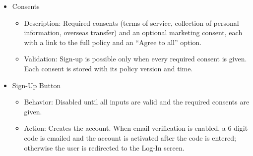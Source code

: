 \documentclass[conference]{IEEEtran}
\begin{document}
\begin{itemize}
\begin{itemize}
\begin{itemize}
            \item Validation: Registration is allowed from 1 January of the year the user turns 19 (Korean Youth Protection Act); only the birth year counts.
        \end{itemize}
        \item Consents
        \begin{itemize}
            \item Description: Required consents (terms of service, collection of personal information, overseas transfer) and an optional marketing consent, each with a link to the full policy and an ``Agree to all'' option.
            \item Validation: Sign-up is possible only when every required consent is given. Each consent is stored with its policy version and time.
        \end{itemize}
        \item Sign-Up Button
        \begin{itemize}
            \item Behavior: Disabled until all inputs are valid and the required consents are given.
            \item Action: Creates the account. When email verification is enabled, a 6-digit code is emailed and the account is activated after the code is entered; otherwise the user is redirected to the Log-In screen.
        \end{itemize}
    \end{itemize}


\end{itemize}
\end{document}
